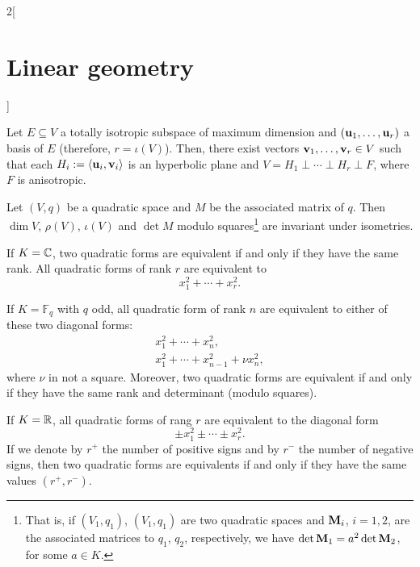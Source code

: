 \documentclass[../../../main.tex]{subfiles}
\begin{document}
\begin{multicols}{2}[\section{Linear geometry}]
\begin{definition}
  \end{definition}
  \begin{theorem}
    Let $E\subseteq V$ a totally isotropic subspace of maximum dimension and $(\boldsymbol{\mathrm{u}}_1,\ldots,\boldsymbol{\mathrm{u}}_r)$ a basis of $E$ (therefore, $r=\iota(V)$). Then, there exist vectors $\boldsymbol{\mathrm{v}}_1,\ldots,\boldsymbol{\mathrm{v}}_r\in V$ such that each $H_i:=\langle\boldsymbol{\mathrm{u}}_i,\boldsymbol{\mathrm{v}}_i\rangle$ is an hyperbolic plane and $V=H_1\perp\cdots\perp H_r\perp F$, where $F$ is anisotropic.
  \end{theorem}
  \begin{prop}
    Let $(V,q)$ be a quadratic space and $M$ be the associated matrix of $q$. Then $\dim V$, $\rho(V)$, $\iota (V)$ and $\det M$ modulo squares\footnote{That is, if $(V_1,q_1)$, $(V_1,q_1)$ are two quadratic spaces and $\boldsymbol{\mathrm{M}}_i$, $i=1,2$, are the associated matrices to $q_1$, $q_2$, respectively, we have $\det \boldsymbol{\mathrm{M}}_1=a^2\det \boldsymbol{\mathrm{M}}_2$, for some $a\in K$.} are invariant under isometries.
  \end{prop}
  \begin{theorem}
    If $K=\mathbb{C} $, two quadratic forms are equivalent if and only if they have the same rank. All quadratic forms of rank $r$ are equivalent to $$x_1^2+\cdots+x_r^2.$$
  \end{theorem}
  \begin{theorem}
    If $K=\mathbb{F}_q$ with $q$ odd, all quadratic form
    of rank $n$ are equivalent to either of these two diagonal forms:
    \begin{gather*}
      x_1^2+\cdots+ x_n^2,\\
      x_1^2+\cdots+ x_{n-1}^2+\nu x_n^2,
    \end{gather*}
    where $\nu$ in not a square. Moreover, two quadratic forms are equivalent if and only if they have the same rank and determinant (modulo squares).
  \end{theorem}
  \begin{theorem}
    If $K=\mathbb{R} $, all quadratic forms
    of rang $r$ are equivalent to the diagonal form
    $$\pm x_1^2\pm\cdots\pm x_r^2.$$ If we denote by $r^+$ the number of positive signs and by $r^-$ the number of negative signs, then two quadratic forms are equivalents if and only if they have the same values $(r^+,r^-)$.
  \end{theorem}

\end{multicols}
\end{document}
